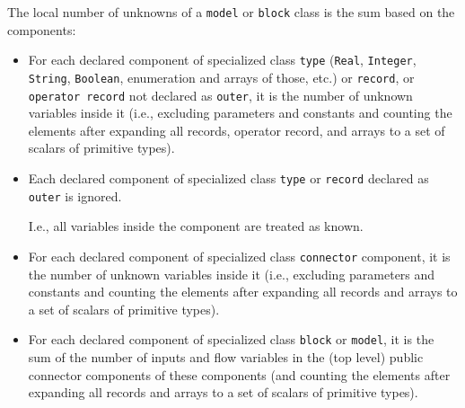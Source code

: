 \begin{definition}
The local number of unknowns of a \lstinline!model! or \lstinline!block! class is the sum based on the components:
\begin{itemize}
\item
  For each declared component of specialized class \lstinline!type! (\lstinline!Real!, \lstinline!Integer!, \lstinline!String!, \lstinline!Boolean!, enumeration and arrays of those, etc.) or \lstinline!record!, or \lstinline!operator record! not declared as \lstinline!outer!, it is the number of unknown variables inside it (i.e., excluding parameters and constants and counting the elements after expanding all records, operator record, and arrays to a set of scalars of primitive types).
\item
  Each declared component of specialized class \lstinline!type! or \lstinline!record! declared as \lstinline!outer! is ignored.
  \begin{nonnormative}
  I.e., all variables inside the component are treated as known.
  \end{nonnormative}
\item
  For each declared component of specialized class \lstinline!connector! component,
  it is the number of unknown variables inside it (i.e., excluding
  parameters and constants and counting the elements after expanding all
  records and arrays to a set of scalars of primitive types).
\item
  For each declared component of specialized class \lstinline!block! or \lstinline!model!, it is
  the sum of the number of inputs and flow variables in the (top
  level) public connector components of these components (and counting
  the elements after expanding all records and arrays to a set of
  scalars of primitive types).
\end{itemize}
\end{definition}

